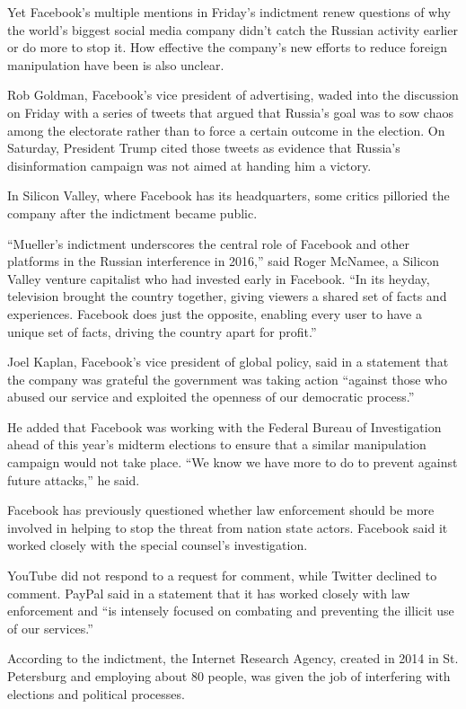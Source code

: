 Yet Facebook's multiple mentions in Friday's indictment renew questions
of why the world's biggest social media company didn't catch the Russian
activity earlier or do more to stop it. How effective the company's new
efforts to reduce foreign manipulation have been is also unclear.

Rob Goldman, Facebook's vice president of advertising, waded into the
discussion on Friday with a series of tweets that argued that Russia's
goal was to sow chaos among the electorate rather than to force a
certain outcome in the election. On Saturday, President Trump cited
those tweets as evidence that Russia's disinformation campaign was not
aimed at handing him a victory.

In Silicon Valley, where Facebook has its headquarters, some critics
pilloried the company after the indictment became public.

``Mueller's indictment underscores the central role of Facebook and
other platforms in the Russian interference in 2016,'' said Roger
McNamee, a Silicon Valley venture capitalist who had invested early in
Facebook. ``In its heyday, television brought the country together,
giving viewers a shared set of facts and experiences. Facebook does just
the opposite, enabling every user to have a unique set of facts, driving
the country apart for profit.''

Joel Kaplan, Facebook's vice president of global policy, said in a
statement that the company was grateful the government was taking action
``against those who abused our service and exploited the openness of our
democratic process.''

He added that Facebook was working with the Federal Bureau of
Investigation ahead of this year's midterm elections to ensure that a
similar manipulation campaign would not take place. ``We know we have
more to do to prevent against future attacks,'' he said.

Facebook has previously questioned whether law enforcement should be
more involved in helping to stop the threat from nation state actors.
Facebook said it worked closely with the special counsel's
investigation.

YouTube did not respond to a request for comment, while Twitter declined
to comment. PayPal said in a statement that it has worked closely with
law enforcement and ``is intensely focused on combating and preventing
the illicit use of our services.''

According to the indictment, the Internet Research Agency, created in
2014 in St. Petersburg and employing about 80 people, was given the job
of interfering with elections and political processes.

